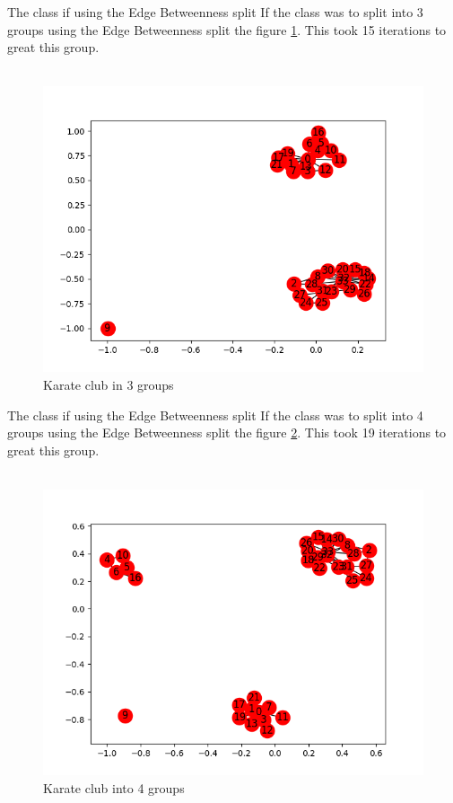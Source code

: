 \documentclass[10pt,letterpaper]{article}
\begin{document}
The class if using the Edge Betweenness split
If the class was to split into 3 groups using the Edge Betweenness split the figure \ref{fig:kart4}.  This took 15 iterations to great this group.\\
\\
\begin{figure}[h!]
  \includegraphics[width=\linewidth]{karate15.png}
  \caption{ Karate club in 3 groups}
  \label{fig:kart4}
\end{figure}

The class if using the Edge Betweenness split
If the class was to split into 4 groups using the Edge Betweenness split the figure \ref{fig:kart5}.  This took 19 iterations to great this group.\\
\\
\begin{figure}[h!]
  \includegraphics[width=\linewidth]{karate19.png}
  \caption{ Karate club into 4 groups}
  \label{fig:kart5}
 \end{figure}
  
\end{document}

